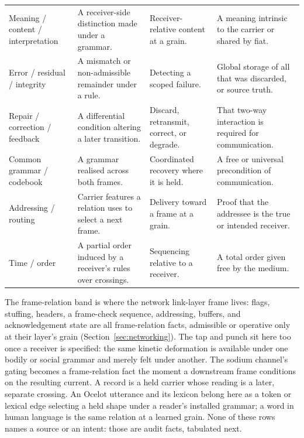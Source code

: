 \documentclass[11pt,a4paper]{article}
\theoremstyle{remark}\newtheorem{remark}[definition]{Remark}
\begin{document}
\begin{table}[t]
\begin{tabular}{@{}>{\raggedright\arraybackslash}p{}>{\raggedright\arraybackslash}p{}>{\raggedright\arraybackslash}p{}>{\raggedright\arraybackslash}p{}@{}}
Meaning / content / interpretation & A receiver-side distinction made under a grammar. & Receiver-relative content at a grain. & A meaning intrinsic to the carrier or shared by fiat.\\
Error / residual / integrity & A mismatch or non-admissible remainder under a rule. & Detecting a scoped failure. & Global storage of all that was discarded, or source truth.\\
Repair / correction / feedback & A differential condition altering a later transition. & Discard, retransmit, correct, or degrade. & That two-way interaction is required for communication.\\
Common grammar / codebook & A grammar realised across both frames. & Coordinated recovery where it is held. & A free or universal precondition of communication.\\
Addressing / routing & Carrier features a relation uses to select a next frame. & Delivery toward a frame at a grain. & Proof that the addressee is the true or intended receiver.\\
Time / order & A partial order induced by a receiver's rules over crossings. & Sequencing relative to a receiver. & A total order given free by the medium.\\
\bottomrule
\end{tabular}
\end{table}
\endgroup

The frame-relation band is where the network link-layer frame lives: flags,
stuffing, headers, a frame-check sequence, addressing, buffers, and
acknowledgement state are all frame-relation facts, admissible or operative only
at their layer's grain (Section~\ref{sec:networking}). The tap and punch sit here
too once a receiver is specified: the same kinetic deformation is available under
one bodily or social grammar and merely felt under another. The sodium channel's
gating becomes a frame-relation fact the moment a downstream frame conditions on
the resulting current. A record is a held carrier whose reading is a later,
separate crossing. An Ocelot utterance and its lexicon belong here as a token or
lexical edge selecting a held shape under a reader's installed grammar; a word in
human language is the same relation at a learned grain. None of these rows names a
source or an intent: those are audit facts, tabulated next.
\end{document}

